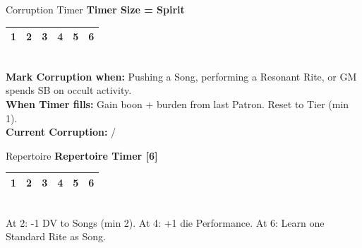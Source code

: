 \documentclass[10pt]{article}
\begin{document}
\begin{minipage}[t]{0.48\linewidth}
    \vspace{0.5em}
    
    \begin{charbox}{Corruption Timer }
        \textbf{Timer Size = Spirit} \underline{\hspace{1.5cm}}\\
        \begin{tabular}{|p{1cm}|p{1cm}|p{1cm}|p{1cm}|p{1cm}|p{1cm}|}
            \hline
            1 & 2 & 3 & 4 & 5 & 6 \\
            \hline
        \end{tabular}\\
        \textbf{Mark Corruption when:} Pushing a Song, performing a Resonant Rite, or GM spends SB on occult activity.\\
        \textbf{When Timer fills:} Gain boon + burden from last Patron. Reset to Tier (min 1).\\
        \textbf{Current Corruption:} \underline{\hspace{1cm}} / \underline{\hspace{1.5cm}}
    \end{charbox}
    
    \vspace{0.5em}
    
    \begin{charbox}{Repertoire}
        \textbf{Repertoire Timer [6]}\\
        \begin{tabular}{|p{1cm}|p{1cm}|p{1cm}|p{1cm}|p{1cm}|p{1cm}|}
            \hline
            1 & 2 & 3 & 4 & 5 & 6 \\
            \hline
        \end{tabular}\\
        At 2: -1 DV to Songs (min 2). At 4: +1 die Performance. At 6: Learn one Standard Rite as Song.
    \end{charbox}
\end{minipage}
\hfill
\end{document}
